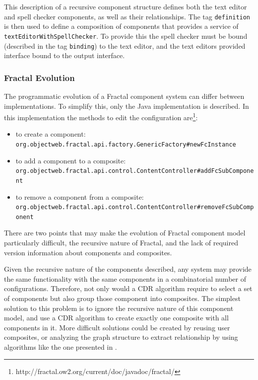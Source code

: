 This description of a recursive component structure defines both the text editor and spell checker components, as well as their relationships.
The tag \verb+definition+ is then used to define a composition of components that provides a service of \verb+textEditorWithSpellChecker+.
To provide this the spell checker must be bound (described in the tag \verb+binding+) to the text editor,
and the text editors provided interface bound to the output interface. 

\subsubsection{Fractal Evolution}
The programmatic evolution of a Fractal component system can differ between implementations.
To simplify this, only the Java implementation is described. 
In this implementation the methods to edit the configuration are\footnote{http://fractal.ow2.org/current/doc/javadoc/fractal/}:
\begin{itemize}
  \item to create a component: \\ \verb+org.objectweb.fractal.api.factory.GenericFactory#newFcInstance+
  \item to add a component to a composite: \\ \verb+org.objectweb.fractal.api.control.ContentController#addFcSubComponent+
  \item to remove a component from a composite: \\ \verb+org.objectweb.fractal.api.control.ContentController#removeFcSubComponent+
\end{itemize}

There are two points that may make the evolution of Fractal component model particularly difficult,
the recursive nature of Fractal, and the lack of required version information about components and composites.

Given the recursive nature of the components described, any system may provide the same functionality with the same components in a combinatorial number of configurations.
Therefore, not only would a CDR algorithm require to select a set of components but also group those component into composites.
The simplest solution to this problem is to ignore the recursive nature of this component model,
and use a CDR algorithm to create exactly one composite with all components in it.
More difficult solutions could be created by reusing user composites,
or analyzing the graph structure to extract relationship by using algorithms like the one presented in \citep{dietrich2008cluster}.


